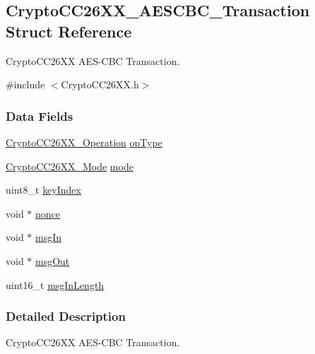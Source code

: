 \subsection{Crypto\+C\+C26\+X\+X\+\_\+\+A\+E\+S\+C\+B\+C\+\_\+\+Transaction Struct Reference}
\label{struct_crypto_c_c26_x_x___a_e_s_c_b_c___transaction}


Crypto\+C\+C26\+X\+X A\+E\+S-\/\+C\+B\+C Transaction.  




{\ttfamily \#include $<$Crypto\+C\+C26\+X\+X.\+h$>$}

\subsubsection*{Data Fields}
\begin{DoxyCompactItemize}
\item 
\hyperlink{_crypto_c_c26_x_x_8h_a28465385e5b45efecc00f2015605f970}{Crypto\+C\+C26\+X\+X\+\_\+\+Operation} \hyperlink{struct_crypto_c_c26_x_x___a_e_s_c_b_c___transaction_a8ce1bb7d63d53cfdb808dc618261aa3c}{op\+Type}
\item 
\hyperlink{_crypto_c_c26_x_x_8h_abf86c8ac428559f00fed3299d439e2cd}{Crypto\+C\+C26\+X\+X\+\_\+\+Mode} \hyperlink{struct_crypto_c_c26_x_x___a_e_s_c_b_c___transaction_a631a21077687d9d59f6ebf898352ca10}{mode}
\item 
uint8\+\_\+t \hyperlink{struct_crypto_c_c26_x_x___a_e_s_c_b_c___transaction_aa1f3d996c876bf337c30691b489c3846}{key\+Index}
\item 
void $\ast$ \hyperlink{struct_crypto_c_c26_x_x___a_e_s_c_b_c___transaction_aff49cae78d6aeda8c9b8ebda71b14c2c}{nonce}
\item 
void $\ast$ \hyperlink{struct_crypto_c_c26_x_x___a_e_s_c_b_c___transaction_aa0a4fe432e28db115802ec35b727cf29}{msg\+In}
\item 
void $\ast$ \hyperlink{struct_crypto_c_c26_x_x___a_e_s_c_b_c___transaction_a5d5bf062f401cc3d1ee0c1e590896184}{msg\+Out}
\item 
uint16\+\_\+t \hyperlink{struct_crypto_c_c26_x_x___a_e_s_c_b_c___transaction_adb2b7d2558d9c979b8983c4c4c0c60d3}{msg\+In\+Length}
\end{DoxyCompactItemize}


\subsubsection{Detailed Description}
Crypto\+C\+C26\+X\+X A\+E\+S-\/\+C\+B\+C Transaction. 

